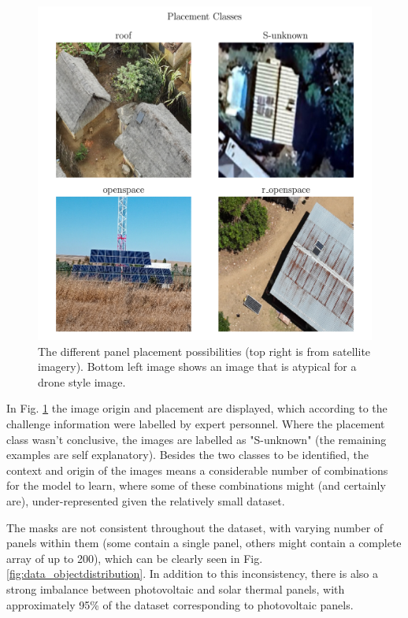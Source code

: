 \documentclass[conference]{IEEEtran}
\begin{document}
\begin{figure}[H]
    \centering
    \includegraphics[width=1\linewidth]{assets/data_placement_classes.png}
    \caption{The different panel placement possibilities (top right is from satellite imagery). Bottom left image shows an image that is atypical for a drone style image.}
    \label{fig:data_placement_classes}
\end{figure}

In Fig. \ref{fig:data_placement_classes} the image origin and placement are displayed, which according to the challenge information were labelled by expert personnel. Where the placement class wasn't conclusive, the images are labelled as "S-unknown" (the remaining examples are self explanatory). Besides the two classes to be identified, the context and origin of the images means a considerable number of combinations for the model to learn, where some of these combinations might (and certainly are), under-represented given the relatively small dataset.

The masks are not consistent throughout the dataset, with varying number of panels within them (some contain a single panel, others might contain a complete array of up to 200), which can be clearly seen in Fig. \ref{fig:data_objectdistribution}. In addition to this inconsistency, there is also a strong imbalance between photovoltaic and solar thermal panels, with approximately 95\% of the dataset corresponding to photovoltaic panels.
\end{document}
